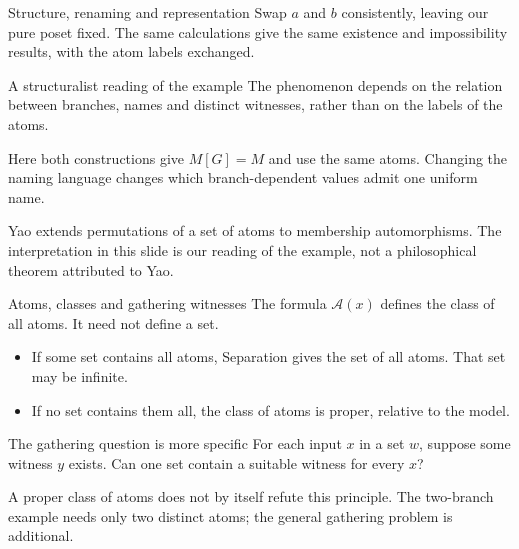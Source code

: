 \documentclass[aspectratio=169,11pt]{beamer}
\begin{document}
\begin{frame}[t]{Structure, renaming and representation}
Swap $a$ and $b$ consistently, leaving our pure poset fixed.
The same calculations give the same existence and impossibility results, with the atom labels exchanged.
\begin{block}{A structuralist reading of the example}
The phenomenon depends on the relation between branches, names and distinct witnesses, rather than on the labels of the atoms.
\end{block}
Here both constructions give $M[G]=M$ and use the same atoms. Changing the naming language changes which branch-dependent values admit one uniform name.
\medskip\par
Yao extends permutations of a set of atoms to membership automorphisms. The interpretation in this slide is our reading of the example, not a philosophical theorem attributed to Yao.
\end{frame}

\begin{frame}[t]{Atoms, classes and gathering witnesses}
The formula $\mathcal A(x)$ defines the class of all atoms. It need not define a set.
\begin{itemize}
\item If some set contains all atoms, Separation gives the set of all atoms. That set may be infinite.
\item If no set contains them all, the class of atoms is proper, relative to the model.
\end{itemize}
\begin{block}{The gathering question is more specific}
For each input $x$ in a set $w$, suppose some witness $y$ exists.
Can one set contain a suitable witness for every $x$?
\end{block}
A proper class of atoms does not by itself refute this principle. The two-branch example needs only two distinct atoms; the general gathering problem is additional.
\end{frame}
\end{document}
